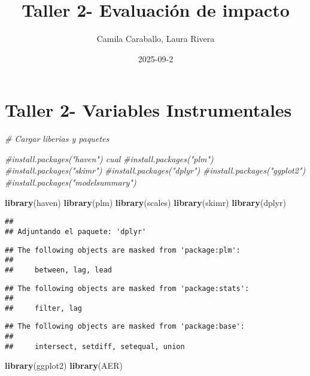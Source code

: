 \documentclass[
]{article}
\title{Taller 2- Evaluación de impacto}
\author{Camila Caraballo, Laura Rivera}
\date{2025-09-2}
\newenvironment{Shaded}{\begin{snugshade}}{\end{snugshade}}
\newcommand{\CommentTok}[1]{\textcolor[rgb]{0.56,0.35,0.01}{\textit{#1}}}
\newcommand{\FunctionTok}[1]{\textcolor[rgb]{0.13,0.29,0.53}{\textbf{#1}}}
\newcommand{\NormalTok}[1]{#1}
\begin{document}
\maketitle

\section{Taller 2- Variables
Instrumentales}\label{taller-2--variables-instrumentales}

\begin{Shaded}
\begin{Highlighting}[]
\CommentTok{\# Cargar liberias y paquetes}

\CommentTok{\#install.packages("haven") cual}
\CommentTok{\#install.packages("plm")}
\CommentTok{\#install.packages("skimr")}
\CommentTok{\#install.packages("dplyr")}
\CommentTok{\#install.packages("ggplot2")}
\CommentTok{\#install.packages("modelsummary")}


\FunctionTok{library}\NormalTok{(haven)}
\FunctionTok{library}\NormalTok{(plm)}
\FunctionTok{library}\NormalTok{(scales)}
\FunctionTok{library}\NormalTok{(skimr)}
\FunctionTok{library}\NormalTok{(dplyr)}
\end{Highlighting}
\end{Shaded}

\begin{verbatim}
## 
## Adjuntando el paquete: 'dplyr'
\end{verbatim}

\begin{verbatim}
## The following objects are masked from 'package:plm':
## 
##     between, lag, lead
\end{verbatim}

\begin{verbatim}
## The following objects are masked from 'package:stats':
## 
##     filter, lag
\end{verbatim}

\begin{verbatim}
## The following objects are masked from 'package:base':
## 
##     intersect, setdiff, setequal, union
\end{verbatim}

\begin{Shaded}
\begin{Highlighting}[]
\FunctionTok{library}\NormalTok{(ggplot2)}
\FunctionTok{library}\NormalTok{(AER)        }
\end{Highlighting}
\end{Shaded}
\end{document}
